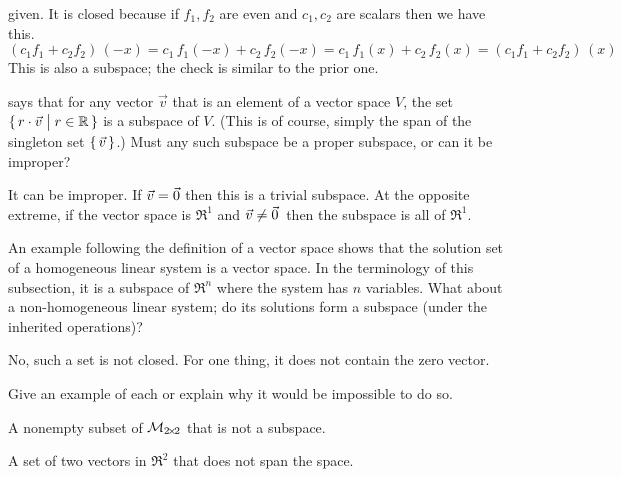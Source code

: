 \begin{exercises}
\begin{answer}
\begin{exparts}
          given.
          It is closed because if \( f_1,f_2 \) are even and
          \( c_1,c_2 \) are scalars then we have this.
          \begin{equation*}
            (c_1f_1+c_2f_2)\,(-x)
            =c_1\,f_1(-x)+c_2\,f_2(-x)
            =c_1\,f_1(x)+c_2\,f_2(x)
            =(c_1f_1+c_2f_2)\,(x)
          \end{equation*}
        \partsitem This is also a subspace; the check is similar to
          the prior one.
      \end{exparts}  
    \end{answer}
  \item 
     says that for any vector $\vec{v}$ 
    that is an element of 
    a vector space $V$, the set $\mbox{$\{\,r\cdot\vec{v}\bigm| r\in\mathbb{R}\,\}$}$
    is a subspace of $V$.
    (This is of course, simply the span 
    of the singleton set $\mbox{$\{\,\vec{v}\,\}$}$.)
    Must any such subspace be a proper subspace, or can it be improper?
    \begin{answer}
      It can be improper.
      If \( \vec{v}=\vec{0} \) then this is a trivial subspace.
      At the opposite extreme,
      if the vector space is \( \Re^1 \) and \( \vec{v}\neq\vec{0}\, \)
      then the subspace is all of $\Re^1$.  
    \end{answer}
  \item 
    An example following the definition of a vector space shows that the
    solution set of a homogeneous linear system is a vector space.
    In the terminology of this subsection, it is a subspace of $\Re^n$ where
    the system has $n$ variables.
    What about a non-homogeneous linear system; do its solutions form a 
    subspace (under the inherited operations)?
    \begin{answer}
      No, such a set is not closed.
      For one thing, it does not contain the zero vector.  
    \end{answer}
  \item \cite{Cleary} 
   Give an example of each or explain why it would be impossible 
   to do so.
   \begin{exparts}
     \item A nonempty subset of $\mathcal{M}_{2 \! \times \! 2}$ that is
       not a subspace.
     \item A set of two vectors in $\Re^2$ that does not span the space.
   \end{exparts}
   \begin{answer}
     \begin{exparts}

\end{exparts}
\end{answer}
\end{exercises}
